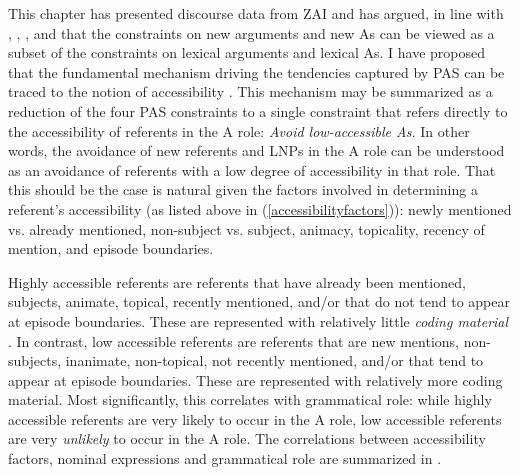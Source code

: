 This chapter has presented discourse data from ZAI and has argued, in line with \citet{haspelmath2006}, \citet{everett2009}, \citet{haig2016}, and \citet{schnell2017} that the constraints on new arguments and new As can be viewed as a subset of the constraints on lexical arguments and lexical As. I have proposed that the fundamental mechanism driving the tendencies captured by PAS can be traced to the notion of accessibility \citep{ariel1990,ariel2001}. This mechanism may be summarized as a reduction of the four PAS constraints to a single constraint that refers directly to the accessibility of referents in the A role: \textit{Avoid low-accessible As.} In other words, the avoidance of new referents and LNPs in the A role can be understood as an avoidance of referents with a low degree of accessibility in that role. That this should be the case is natural given the factors involved in determining a referent's accessibility (as listed above in (\ref{accessibilityfactors})): newly mentioned vs. already mentioned, non-subject vs. subject, animacy, topicality, recency of mention, and episode boundaries. 

Highly accessible referents are referents that have already been mentioned, subjects, animate, topical, recently mentioned, and/or that do not tend to appear at episode boundaries. These are represented with relatively little \textit{coding material} \citep{givon1983}. In contrast, low accessible referents are referents that are new mentions, non-subjects, inanimate, non-topical, not recently mentioned, and/or that tend to appear at episode boundaries. These are represented with relatively more coding material. Most significantly, this correlates with grammatical role: while highly accessible referents are very likely to occur in the A role, low accessible referents are very \textit{unlikely} to occur in the A role. The correlations between accessibility factors, nominal expressions and grammatical role are summarized in .


